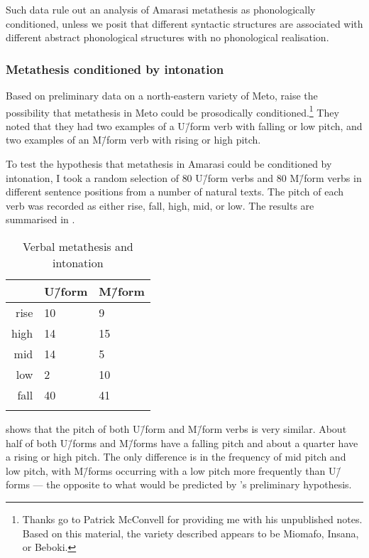 Such data rule out an analysis of Amarasi metathesis
as phonologically conditioned,
unless we posit that different
syntactic structures are associated with different abstract
phonological structures with no phonological realisation.

\subsubsection{Metathesis conditioned by intonation}\label{sec:MetConInt}
Based on preliminary data on a north-eastern variety of Meto, \cite{mccko96}
raise the possibility that metathesis in Meto could be prosodically conditioned.\footnote{
		Thanks go to Patrick McConvell for providing me with his unpublished notes.
		Based on this material, the variety described appears to be Miomafo, Insana, or Beboki.}
They noted that they had two examples of a U\=/form verb with falling or low pitch,
and two examples of an M\=/form verb with rising or high pitch.

To test the hypothesis that metathesis in Amarasi could be conditioned by intonation,
I took a random selection of 80 U\=/form verbs and 80 M\=/form verbs
in different sentence positions from a number of natural texts.
The pitch of each verb was recorded as either rise, fall, high, mid, or low.
The results are summarised in .

\begin{table}[h]
	\caption{Verbal metathesis and intonation}\label{tab:VerMetInt}
	\centering
		\begin{tabular}{rll}\lsptoprule
						& U\=/form	& M\=/form	\\ \midrule
			rise	& 10			& 9				\\
			high	& 14			& 15			\\
			mid		& 14			& 5				\\
			low		& 2				& 10			\\
			fall	&	40			& 41			\\
			\lspbottomrule
		\end{tabular}
\end{table}

 shows that the pitch of both U\=/form
and M\=/form verbs is very similar.
About half of both U\=/forms and M\=/forms have a falling pitch
and about a quarter have a rising or high pitch.
The only difference is in the frequency  of mid pitch and low pitch,
with M\=/forms occurring with a low pitch more frequently than U\=/forms
--- the opposite to what would be predicted by \citeauthor{mccko96}'s preliminary hypothesis.

